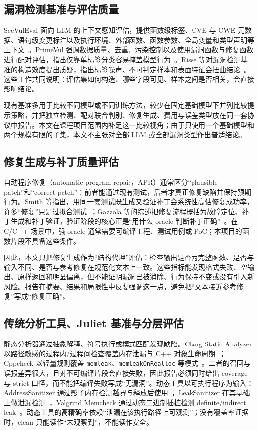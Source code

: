 \documentclass[conference]{IEEEtran}
\begin{document}
\subsection{漏洞检测基准与评估质量}
SecVulEval 面向 LLM 的上下文感知评估，提供函数级标签、CVE 与 CWE 元数据、语句级变更标注以及执行环境、外部函数、函数参数、全局变量和类型声明等上下文~\cite{ahmed2026secvuleval,secvulevaldata}。PrimeVul 强调数据质量、去重、污染控制以及使用漏洞函数与修复函数进行配对评估，指出仅靠单标签分类容易掩盖模型行为~\cite{ding2025primevul}。Risse 等对漏洞检测基准的构造效度提出质疑，指出标签噪声、不可判定样本和表面特征会扭曲结论~\cite{risse2024limits,risse2025topscore}。这些工作共同说明：评估集如何构造、哪些字段可见、样本之间是否相关，会直接影响结论。

现有基准多用于比较不同模型或不同训练方法，较少在固定基础模型下并列比较提示策略，并把独立检测、配对联合判别、修复生成、费用与误差类型放在同一套协议中报告。本文在课程项目范围内补足这一比较视角；由于只使用一个基础模型和两个规模有限的子集，本文不主张对全部 LLM 或全部漏洞类型作出普适结论。

\subsection{修复生成与补丁质量评估}
自动程序修复（automatic program repair，APR）通常区分“plausible patch”和“correct patch”：前者能通过现有测试，后者才真正修复缺陷并保持预期行为。Smith 等指出，用同一套测试既生成又验证补丁会系统性高估修复成功率，许多“修复”只是过拟合测试~\cite{smith2015overfitting}；Gazzola 等的综述把修复流程概括为故障定位、补丁生成和补丁验证，验证阶段的核心正是“用什么 oracle 判断补丁正确”~\cite{gazzola2019apr}。在 C/C++ 场景中，强 oracle 通常需要可编译工程、测试用例或 PoC；本项目的函数片段不具备这些条件。

因此，本文只把修复生成作为“结构代理”评估：检查输出是否为完整函数、是否与输入不同、是否与参考修复在规范化文本上一致。这些指标能发现格式失败、空输出、原样返回和明显偏离，但不能证明漏洞已被消除、行为保持不变或没有引入新风险。报告在摘要、结果和局限性中反复强调这一点，避免把“文本接近参考修复”写成“修复正确”。

\subsection{传统分析工具、Juliet 基准与分层评估}
静态分析器通过抽象解释、符号执行或模式匹配发现缺陷。Clang Static Analyzer 以路径敏感的过程内/过程间检查覆盖内存泄漏与 C++ 对象生命周期~\cite{clangsa}；Cppcheck 以轻量规则覆盖 \texttt{memleak}、\texttt{memleakOnRealloc} 等模式~\cite{cppcheck}。二者的召回与误报差异很大，且对不可编译片段会直接失败，因此报告必须同时给出 coverage 与 strict 口径，而不能把编译失败写成“无漏洞”。动态工具以可执行程序为输入：AddressSanitizer 通过影子内存检测越界与释放后使用~\cite{serebryany2012asan}，LeakSanitizer 在其基础上做泄漏检测~\cite{lsan}，Valgrind Memcheck 通过动态二进制插桩检测 definite/indirect leak~\cite{nethercote2007valgrind}。动态工具的高精确率依赖“泄漏在该执行路径上可观测”；没有覆盖率证据时，clean 只能读作“未观察到”，不能读作安全。
\end{document}
